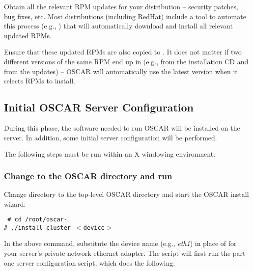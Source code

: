 Obtain all the relevant RPM updates for your distribution -- security
patches, bug fixes, etc.  Most distributions (including RedHat)
include a tool to automate this process (e.g., ) that
will automatically download and install all relevant updated RPMs.

Ensure that these updated RPMs are also copied to
.  It does not matter if two different versions of
the same RPM end up in  (e.g.,
 from the installation CD and
 from the updates) -- OSCAR will
automatically use the latest version when it selects RPMs to install.

  
\subsection{Initial OSCAR Server Configuration}

During this phase, the software needed to run OSCAR will be installed
on the server. In addition, some initial server configuration will be
performed. 

The following steps must be run within an X windowing environment.


\subsubsection{Change to the OSCAR directory and run }
\label{det:installcluster}

Change directory to the top-level OSCAR directory and start the OSCAR
install wizard:

\vspace{11pt}
{\tt
\# cd /root/oscar-\oscarversion \\
\indent \# ./install\_cluster $<$device$>$
}
\vspace{11pt}
  
In the above command, substitute the device name (e.g., \emph{eth1})
in place of  for your server's private network
ethernet adapter.  The script will first run the part one server
configuration script, which does the following:

